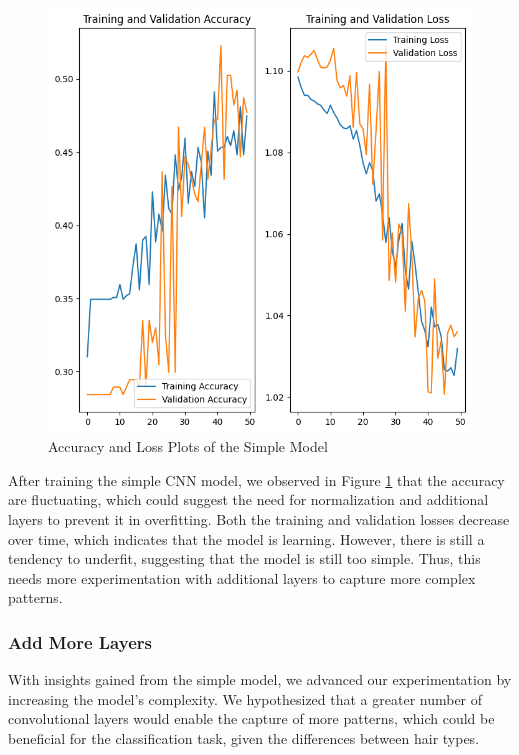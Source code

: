 \begin{figure}[H]
  \includegraphics[width=\linewidth]{figures/simple_model.png}
  \caption{Accuracy and Loss Plots of the Simple Model}
  \label{fig:simple_model}
\end{figure}

After training the simple CNN model, we observed in Figure \ref{fig:simple_model} that the accuracy are fluctuating, which could suggest the need for normalization and additional layers to prevent it in overfitting. Both the training and validation losses decrease over time, which indicates that the model is learning. However, there is still a tendency to underfit, suggesting that the model is still too simple. Thus, this needs more experimentation with additional layers to capture more complex patterns.

\subsubsection{Add More Layers}

With insights gained from the simple model, we advanced our experimentation by increasing the model's complexity. We hypothesized that a greater number of convolutional layers would enable the capture of more patterns, which could be beneficial for the classification task, given the differences between hair types.

